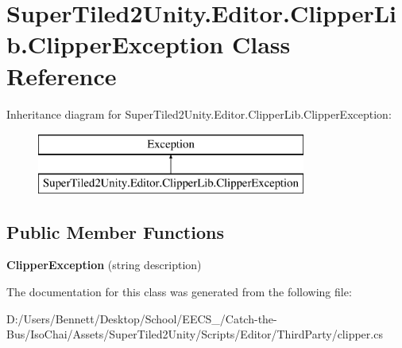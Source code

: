 \hypertarget{class_super_tiled2_unity_1_1_editor_1_1_clipper_lib_1_1_clipper_exception}{}\section{Super\+Tiled2\+Unity.\+Editor.\+Clipper\+Lib.\+Clipper\+Exception Class Reference}
\label{class_super_tiled2_unity_1_1_editor_1_1_clipper_lib_1_1_clipper_exception}
Inheritance diagram for Super\+Tiled2\+Unity.\+Editor.\+Clipper\+Lib.\+Clipper\+Exception\+:\begin{figure}[H]
\begin{center}
\leavevmode
\includegraphics[height=2.000000cm]{class_super_tiled2_unity_1_1_editor_1_1_clipper_lib_1_1_clipper_exception}
\end{center}
\end{figure}
\subsection*{Public Member Functions}
\begin{DoxyCompactItemize}
\item 
\mbox{\label{class_super_tiled2_unity_1_1_editor_1_1_clipper_lib_1_1_clipper_exception_af9cc5400b96da7a632e39ea7173b2a83}} 
{\bfseries Clipper\+Exception} (string description)
\end{DoxyCompactItemize}


The documentation for this class was generated from the following file\+:\begin{DoxyCompactItemize}
\item 
D\+:/\+Users/\+Bennett/\+Desktop/\+School/\+E\+E\+C\+S\+\_/\+Catch-\/the-\/\+Bus/\+Iso\+Chai/\+Assets/\+Super\+Tiled2\+Unity/\+Scripts/\+Editor/\+Third\+Party/clipper.\+cs\end{DoxyCompactItemize}
